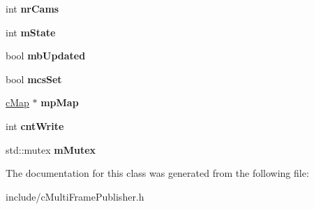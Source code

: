 \begin{DoxyCompactItemize}
\item 
int {\bfseries nr\+Cams}\hypertarget{classMultiColSLAM_1_1cMultiFramePublisher_ad2a55b25b5798f597954d9a09db0c49b}{}\label{classMultiColSLAM_1_1cMultiFramePublisher_ad2a55b25b5798f597954d9a09db0c49b}

\item 
int {\bfseries m\+State}\hypertarget{classMultiColSLAM_1_1cMultiFramePublisher_a0f923017935bb5e0fc2a5de0c26860de}{}\label{classMultiColSLAM_1_1cMultiFramePublisher_a0f923017935bb5e0fc2a5de0c26860de}

\item 
bool {\bfseries mb\+Updated}\hypertarget{classMultiColSLAM_1_1cMultiFramePublisher_a9c6a831abba382f266b8592eba9043cf}{}\label{classMultiColSLAM_1_1cMultiFramePublisher_a9c6a831abba382f266b8592eba9043cf}

\item 
bool {\bfseries mcs\+Set}\hypertarget{classMultiColSLAM_1_1cMultiFramePublisher_a3556d37c3f91f85112676e94609ae9b6}{}\label{classMultiColSLAM_1_1cMultiFramePublisher_a3556d37c3f91f85112676e94609ae9b6}

\item 
\hyperlink{classMultiColSLAM_1_1cMap}{c\+Map} $\ast$ {\bfseries mp\+Map}\hypertarget{classMultiColSLAM_1_1cMultiFramePublisher_a44dbdb4e8bbfb894bb88d1cee05e97f5}{}\label{classMultiColSLAM_1_1cMultiFramePublisher_a44dbdb4e8bbfb894bb88d1cee05e97f5}

\item 
int {\bfseries cnt\+Write}\hypertarget{classMultiColSLAM_1_1cMultiFramePublisher_a41f62c9f553a2ea46df7223c15444539}{}\label{classMultiColSLAM_1_1cMultiFramePublisher_a41f62c9f553a2ea46df7223c15444539}

\item 
std\+::mutex {\bfseries m\+Mutex}\hypertarget{classMultiColSLAM_1_1cMultiFramePublisher_a496042c62127f9e88cdca06664bc50cb}{}\label{classMultiColSLAM_1_1cMultiFramePublisher_a496042c62127f9e88cdca06664bc50cb}

\end{DoxyCompactItemize}


The documentation for this class was generated from the following file\+:\begin{DoxyCompactItemize}
\item 
include/c\+Multi\+Frame\+Publisher.\+h\end{DoxyCompactItemize}

